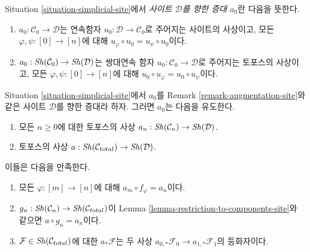 \begin{remark}
\label{remark-augmentation-site}
Situation \ref{situation-simplicial-site}에서
{\it 사이트 $\mathcal{D}$를 향한 증대 $a_0$}란 다음을 뜻한다.
\begin{enumerate}
\item[(A)] $a_0 : \mathcal{C}_0 \to \mathcal{D}$는 연속함자
$u_0 : \mathcal{D} \to \mathcal{C}_0$로 주어지는 사이트의 사상이고,
모든 $\varphi, \psi : [0] \to [n]$에 대해
$u_\varphi \circ u_0 = u_\psi \circ u_0$이다.
\item[(B)] $a_0 : \mathop{\mathit{Sh}}\nolimits(\mathcal{C}_0) \to \mathop{\mathit{Sh}}\nolimits(\mathcal{D})$는
쌍대연속 함자 $u_0 : \mathcal{C}_0 \to \mathcal{D}$로 주어지는
토포스의 사상이고, 모든 $\varphi, \psi : [0] \to [n]$에 대해
$u_0 \circ u_\varphi = u_0 \circ u_\psi$이다.
\end{enumerate}
\end{remark}

\begin{lemma}
\label{lemma-augmentation-site}
Situation \ref{situation-simplicial-site}에서 $a_0$를 Remark
\ref{remark-augmentation-site}와 같은 사이트 $\mathcal{D}$를 향한
증대라 하자. 그러면 $a_0$는 다음을 유도한다.
\begin{enumerate}
\item 모든 $n \geq 0$에 대한 토포스의 사상
$a_n : \mathop{\mathit{Sh}}\nolimits(\mathcal{C}_n) \to \mathop{\mathit{Sh}}\nolimits(\mathcal{D})$.
\item 토포스의 사상
$a : \mathop{\mathit{Sh}}\nolimits(\mathcal{C}_{total}) \to \mathop{\mathit{Sh}}\nolimits(\mathcal{D})$.
\end{enumerate}
이들은 다음을 만족한다.
\begin{enumerate}
\item 모든 $\varphi : [m] \to [n]$에 대해
$a_m \circ f_\varphi = a_n$이다.
\item $g_n : \mathop{\mathit{Sh}}\nolimits(\mathcal{C}_n) \to \mathop{\mathit{Sh}}\nolimits(\mathcal{C}_{total})$이
Lemma \ref{lemma-restriction-to-components-site}와 같으면
$a \circ g_n = a_n$이다.
\item $\mathcal{F} \in \mathop{\mathit{Sh}}\nolimits(\mathcal{C}_{total})$에 대한
$a_*\mathcal{F}$는 두 사상
$a_{0, *}\mathcal{F}_0 \to a_{1, *}\mathcal{F}_1$의 등화자이다.
\end{enumerate}
\end{lemma}

